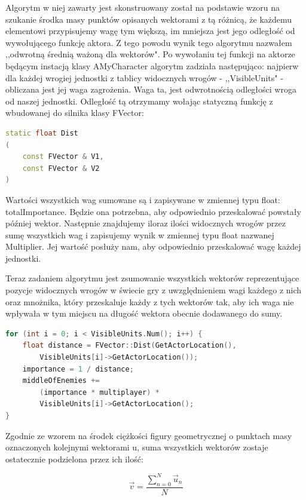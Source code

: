 \documentclass[12pt]{report}
\begin{document}
Algorytm w niej zawarty jest skonstruowany został na podstawie wzoru na szukanie środka masy punktów opisanych wektorami z tą różnicą, że każdemu elementowi przypisujemy wagę tym większą, im mniejsza jest jego odległość od wywołującego funkcję aktora. Z tego powodu wynik tego algorytmu nazwałem ,,odwrotną średnią ważoną dla wektorów". Po wywołaniu tej funkcji na aktorze będącym instacją klasy AMyCharacter algorytm zadziała następująco:
najpierw dla każdej wrogiej jednostki z tablicy widocznych wrogów - ,,VisibleUnits" - obliczana jest jej waga zagrożenia. Waga ta, jest odwrotnością odległości wroga od naszej jednostki. Odległość tą otrzymamy wołając statyczną funkcję z wbudowanej do silnika klasy FVector:

\begin{lstlisting}[language=C++, backgroundcolor=\color{black!5}, basicstyle=\footnotesize, caption=Deklaracja funkcji Dist() w klasie FVector]
static float Dist
(
    const FVector & V1,
    const FVector & V2
)
\end{lstlisting}
Wartości wszystkich wag sumowane są i zapisywane w zmiennej typu float: totalImportance. Będzie ona potrzebna, aby odpowiednio przeskalować powstały później wektor. Następnie znajdujemy iloraz ilości widocznych wrogów przez sumę wszystkich wag i zapisujemy wynik w zmiennej typu float nazwanej Multiplier. Jej wartość posłuży nam, aby odpowiednio przeskalować wagę każdej jednostki.

Teraz zadaniem algorytmu jest zsumowanie wszystkich wektorów reprezentujące pozycje widocznych wrogów w świecie gry z uwzględnieniem wagi każdego z nich oraz mnożnika, który przeskaluje każdy z tych wektorów tak, aby ich waga nie wpływała w tym miejscu na długość wektora obecnie dodawanego do sumy.
\begin{lstlisting}[language=C++, backgroundcolor=\color{black!5}, basicstyle=\footnotesize, caption=Pętla sumująca wektory pozycji wrogów z uwzględnieniem ich wag]
for (int i = 0; i < VisibleUnits.Num(); i++) {
    float distance = FVector::Dist(GetActorLocation(), 
        VisibleUnits[i]->GetActorLocation());
	importance = 1 / distance;
	middleOfEnemies += 
	    (importance * multiplayer) *  
	    VisibleUnits[i]->GetActorLocation();
}
\end{lstlisting}

Zgodnie ze wzorem na środek ciężkości figury geometrycznej o punktach masy oznaczonych kolejnymi wektorami u, suma wszystkich wektorów zostaje ostatecznie podzielona przez ich ilość:

$$\vec v = \dfrac{\sum_{n=0}^{N}  \vec u_n}{N}   $$
\end{document}
